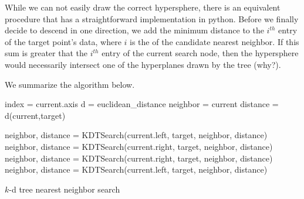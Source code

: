 While we can not easily draw the correct hypersphere, there is an equivalent procedure that has a straightforward implementation in python.
Before we finally decide to descend in one direction, we add the minimum distance to the $i^{th}$ entry of the target point's data, where $i$ is the  of the candidate nearest neighbor.
If this sum is greater that the $i^{th}$ entry of the current search node, then the hypersphere would necessarily intersect one of the hyperplanes drawn by the tree (why?).

We summarize the algorithm below.

\begin{algorithm}
\begin{algorithmic}[1]
\State index = current.axis
\State d = euclidean\_distance
		\State neighbor = current
		\State distance = d(current,target)
	\EndIf
	
		\State neighbor, distance = KDTSearch(current.left, target,
			\State									neighbor, distance)
			\State neighbor, distance = KDTSearch(current.right, target,
				\State									neighbor, distance)
		\EndIf
	\Else
		\State neighbor, distance = KDTSearch(current.right, target,
			\State									neighbor, distance)
			\State neighbor, distance = KDTSearch(current.left, target,
				\State									neighbor, distance)
		\EndIf
	\EndIf
\EndProcedure
\end{algorithmic}
\caption{$k$-d tree nearest neighbor search}
\label{alg:kdneighborz}
\end{algorithm}


